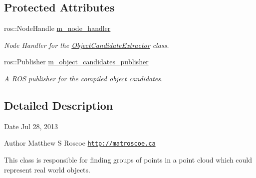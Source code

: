 \subsection*{\-Protected \-Attributes}
\begin{DoxyCompactItemize}
\item 
\hypertarget{class_object_candidate_extractor_a9a0da45687232f96360f76175a3cb097}{ros\-::\-Node\-Handle \hyperlink{class_object_candidate_extractor_a9a0da45687232f96360f76175a3cb097}{m\-\_\-node\-\_\-handler}}\label{class_object_candidate_extractor_a9a0da45687232f96360f76175a3cb097}

\begin{DoxyCompactList}\small\item\em \-Node \-Handler for the \hyperlink{class_object_candidate_extractor}{\-Object\-Candidate\-Extractor} class. \end{DoxyCompactList}\item 
\hypertarget{class_object_candidate_extractor_a3b5cd0451266eafe0aba2d950a7434e8}{ros\-::\-Publisher \hyperlink{class_object_candidate_extractor_a3b5cd0451266eafe0aba2d950a7434e8}{m\-\_\-object\-\_\-candidates\-\_\-publisher}}\label{class_object_candidate_extractor_a3b5cd0451266eafe0aba2d950a7434e8}

\begin{DoxyCompactList}\small\item\em \-A \-R\-O\-S publisher for the compiled object candidates. \end{DoxyCompactList}\end{DoxyCompactItemize}


\subsection{\-Detailed \-Description}
\begin{DoxyDate}{\-Date}
\-Jul 28, 2013 
\end{DoxyDate}
\begin{DoxyAuthor}{\-Author}
\-Matthew \-S \-Roscoe \href{http://matroscoe.ca}{\tt http\-://matroscoe.\-ca}
\end{DoxyAuthor}
\-This class is responsible for finding groups of points in a point cloud which could represent real world objects. 

